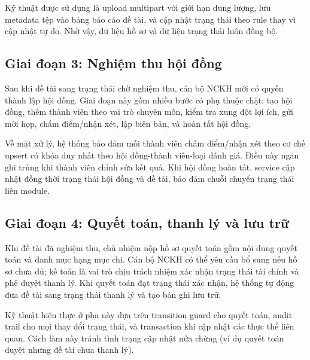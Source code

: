 \documentclass[12pt,a4paper]{report}
\begin{document}
Kỹ thuật được sử dụng là upload multipart với giới hạn dung lượng, lưu metadata tệp vào bảng báo cáo đề tài, và cập nhật trạng thái theo rule thay vì cập nhật tự do. Nhờ vậy, dữ liệu hồ sơ và dữ liệu trạng thái luôn đồng bộ.

\subsection{Giai đoạn 3: Nghiệm thu hội đồng}
Sau khi đề tài sang trạng thái chờ nghiệm thu, cán bộ NCKH mới có quyền thành lập hội đồng. Giai đoạn này gồm nhiều bước có phụ thuộc chặt: tạo hội đồng, thêm thành viên theo vai trò chuyên môn, kiểm tra xung đột lợi ích, gửi mời họp, chấm điểm/nhận xét, lập biên bản, và hoàn tất hội đồng.

Về mặt xử lý, hệ thống bảo đảm mỗi thành viên chấm điểm/nhận xét theo cơ chế upsert có khóa duy nhất theo hội đồng-thành viên-loại đánh giá. Điều này ngăn ghi trùng khi thành viên chỉnh sửa kết quả. Khi hội đồng hoàn tất, service cập nhật đồng thời trạng thái hội đồng và đề tài, bảo đảm chuỗi chuyển trạng thái liên module.

\subsection{Giai đoạn 4: Quyết toán, thanh lý và lưu trữ}
Khi đề tài đã nghiệm thu, chủ nhiệm nộp hồ sơ quyết toán gồm nội dung quyết toán và danh mục hạng mục chi. Cán bộ NCKH có thể yêu cầu bổ sung nếu hồ sơ chưa đủ; kế toán là vai trò chịu trách nhiệm xác nhận trạng thái tài chính và phê duyệt thanh lý. Khi quyết toán đạt trạng thái xác nhận, hệ thống tự động đưa đề tài sang trạng thái thanh lý và tạo bản ghi lưu trữ.

Kỹ thuật hiện thực ở pha này dựa trên transition guard cho quyết toán, audit trail cho mọi thay đổi trạng thái, và transaction khi cập nhật các thực thể liên quan. Cách làm này tránh tình trạng cập nhật nửa chừng (ví dụ quyết toán duyệt nhưng đề tài chưa thanh lý).
\end{document}
